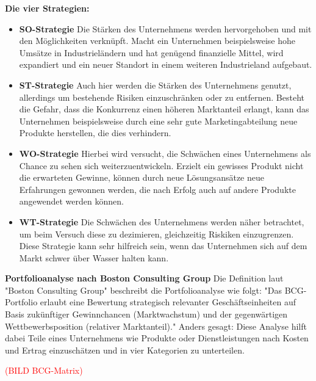   \textbf{Die vier Strategien:}
  \begin{itemize}
    \item \textbf{SO-Strategie}
    Die Stärken des Unternehmens werden hervorgehoben und mit den Möglichkeiten verknüpft. Macht ein Unternehmen beispielsweise hohe Umsätze in Industrieländern und hat
    genügend finanzielle Mittel, wird expandiert und ein neuer Standort in einem weiteren Industrieland aufgebaut.

    \item \textbf{ST-Strategie}
    Auch hier werden die Stärken des Unternehmens genutzt, allerdings um bestehende Risiken einzuschränken oder zu entfernen. Besteht die Gefahr, dass die Konkurrenz
    einen höheren Marktanteil erlangt, kann das Unternehmen beispielsweise durch eine sehr gute Marketingabteilung neue Produkte herstellen, die dies verhindern.

    \item \textbf{WO-Strategie}
    Hierbei wird versucht, die Schwächen eines Unternehmens als Chance zu sehen sich weiterzuentwickeln. Erzielt ein gewisses Produkt nicht die erwarteten Gewinne,
    können durch neue Lösungsansätze neue Erfahrungen gewonnen werden, die nach Erfolg auch auf andere Produkte angewendet werden können.

    \item \textbf{WT-Strategie}
    Die Schwächen des Unternehmens werden näher betrachtet, um beim Versuch diese zu dezimieren, gleichzeitig Riskiken einzugrenzen. Diese Strategie kann sehr hilfreich
    sein, wenn das Unternehmen sich auf dem Markt schwer über Wasser halten kann.
  \end{itemize}

  \textbf{Portfolioanalyse nach Boston Consulting Group}
  Die Definition laut {"Boston Consulting Group"\cite{portfolioanalyse}} beschreibt die Portfolioanalyse wie folgt:
  "Das BCG-Portfolio erlaubt eine Bewertung strategisch relevanter Geschäftseinheiten auf Basis zukünftiger Gewinnchancen (Marktwachstum) und der
  gegenwärtigen Wettbewerbsposition (relativer Marktanteil)." Anders gesagt: Diese Analyse hilft dabei Teile eines Unternehmens wie Produkte oder Dienstleistungen
  nach Kosten und Ertrag einzuschätzen und in vier Kategorien zu unterteilen.

  \textcolor{red}{(BILD BCG-Matrix)}

